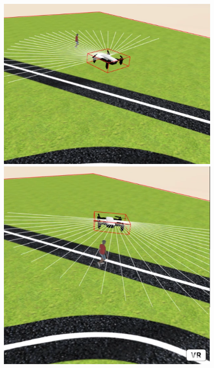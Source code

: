 \begin{figure}[!htb]
    \includegraphics[width=\linewidth]{figures/simulado/comp_1.png}
\endminipage\hfill
{}
    \includegraphics[width=\linewidth]{figures/simulado/comp_2.png}
\endminipage\hfill
{}

\end{figure}
